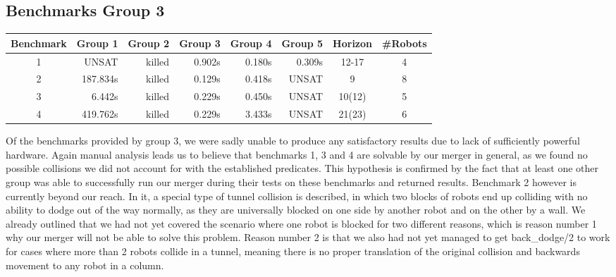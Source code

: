 \documentclass{llncs}
\begin{document}
\subsection{ Benchmarks Group 3}
\begin{table}[]
\begin{tabular}{|c|r|r|r|r|r|c|c|}
\hline
\multicolumn{1}{|l|}{Benchmark} & \multicolumn{1}{l|}{Group 1} & \multicolumn{1}{l|}{Group 2} & \multicolumn{1}{l|}{Group 3} & \multicolumn{1}{l|}{Group 4} & \multicolumn{1}{l|}{Group 5} & Horizon & \multicolumn{1}{l|}{\#Robots} \\ \hline
1                               & UNSAT                        & killed                       & 0.902s                       & 0.180s                       & 0.309s                       & 12-17   & 4                             \\ \hline
2                               & 187.834s                     & killed                       & 0.129s                       & 0.418s                       & UNSAT                        & 9       & 8                             \\ \hline
3                               & 6.442s                       & killed                       & 0.229s                       & 0.450s                       & UNSAT                        & 10(12)   & 5                             \\ \hline
4                               & 419.762s                     & killed                       & 0.229s                        & 3.433s                       & UNSAT                        & 21(23)   & 6                             \\ \hline
\end{tabular}
\end{table}
Of the benchmarks provided by group 3, we were sadly unable to produce any satisfactory results due to lack of sufficiently powerful hardware. Again manual analysis leads us to believe that benchmarks 1, 3 and 4 are solvable by our merger in general, as we found no possible collisions we did not account for with the established predicates. This hypothesis is confirmed by the fact that at least one other group was able to successfully run our merger during their tests on these benchmarks and returned results.\newline
Benchmark 2 however is currently beyond our reach. In it, a special type of tunnel collision is described, in which two blocks of robots end up colliding with no ability to dodge out of the way normally, as they are universally blocked on one side by another robot and on the other by a wall. We already outlined that we had not yet covered the scenario where one robot is blocked for two different reasons, which is reason number 1 why our merger will not be able to solve this problem. Reason number 2 is that we also had not yet managed to get back\_dodge/2 to work for cases where more than 2 robots collide in a tunnel, meaning there is no proper translation of the original collision and backwards movement to any robot in a column.
\end{document}
